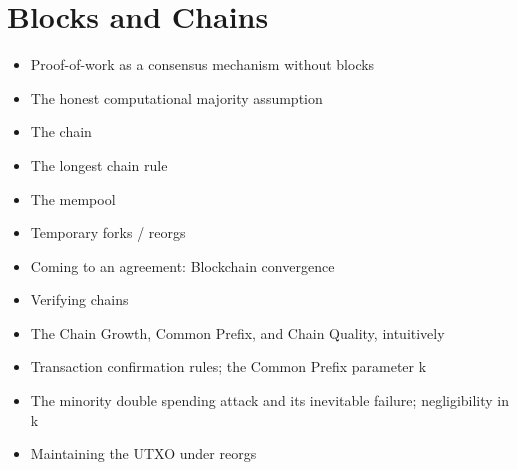\chapter{Blocks and Chains}

{\color{red}
\begin{itemize}
\item Proof-of-work as a consensus mechanism without blocks
\item The honest computational majority assumption
\item The chain
\item The longest chain rule
\item The mempool
\item Temporary forks / reorgs
\item Coming to an agreement: Blockchain convergence
\item Verifying chains
\item The Chain Growth, Common Prefix, and Chain Quality, intuitively
\item Transaction confirmation rules; the Common Prefix parameter k
\item The minority double spending attack and its inevitable failure; negligibility in k
\item Maintaining the UTXO under reorgs
\end{itemize}
}
